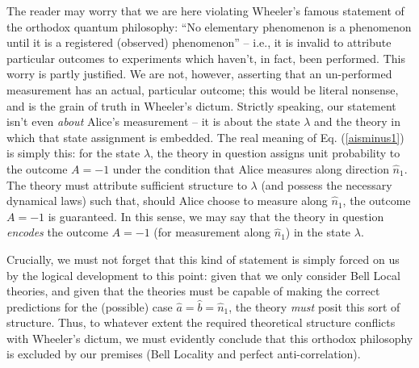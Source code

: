 \documentclass[aps,prc,onecolumn,12pt,nofootinbib]{revtex4-2}
\begin{document}
The reader may worry that we are here violating
Wheeler's famous statement of the orthodox
quantum philosophy:  ``No elementary phenomenon is a phenomenon
until it is a registered (observed) phenomenon'' \cite{wheelerquote}
-- i.e., it
is invalid to attribute particular outcomes to experiments which
haven't, in fact, been performed.  This worry is partly justified.
We are not, however,
asserting that an un-performed measurement has an actual, particular
outcome; this would be literal nonsense, and is the grain of truth in
Wheeler's dictum.  Strictly speaking, our statement isn't even
\emph{about} Alice's measurement -- it is about the state $\lambda$
and the theory in which that state assignment is embedded.  The
real meaning of Eq. (\ref{aisminus1}) is simply this:
for the state $\lambda$, the theory in question
assigns unit probability to the outcome $A = -1$ under the condition
that Alice measures along direction $\hat{n}_1$.  The theory must
attribute sufficient structure to $\lambda$ (and possess the necessary
dynamical laws) such that, should Alice choose to measure along
$\hat{n}_1$, the outcome $A = -1$ is guaranteed.  In this sense, we
may say that the theory in question \emph{encodes} the outcome $A =
-1$ (for measurement along $\hat{n}_1$) in the state $\lambda$.

Crucially, we must not forget that this kind of
statement is simply forced on us by the logical development to this
point:  given that we only consider Bell Local theories, and given
that the theories must be capable of making the correct predictions
for the (possible) case $\hat{a} = \hat{b} = \hat{n}_1$, the theory
\emph{must} posit this sort of structure.  Thus, to whatever extent
the required theoretical structure conflicts with Wheeler's dictum,
we must evidently conclude that this orthodox philosophy is excluded
by our premises (Bell Locality and perfect anti-correlation).
\end{document}
